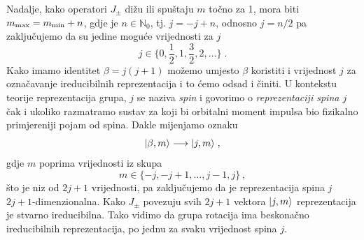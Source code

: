 Nadalje, kako operatori $J_\pm$ dižu ili spuštaju $m$ točno za 1, mora
biti $m_{\textrm{\scriptsize max}} = m_{\textrm{\scriptsize min}} +n $,
gdje je $n\in \mathbb{N}_{0}$, tj. $j = -j +n$, odnosno $j=n/2$ pa
zaključujemo da su jedine moguće vrijednosti za $j$
\begin{displaymath}
    j \in \{ 0, \frac{1}{2}, 1, \frac{3}{2}, 2, \ldots \}\;.
\end{displaymath}
Kako imamo identitet $\beta = j(j+1)$ možemo umjesto $\beta$ koristiti
i vrijednost $j$ za označavanje ireducibilnih reprezentacija i to ćemo
odsad i činiti. U kontekstu teorije reprezentacija grupa, $j$ se naziva
\emph{spin} i govorimo o \emph{reprezentaciji spina $j$} čak i ukoliko
razmatramo sustav za koji bi orbitalni moment impulsa
bio fizikalno primjereniji pojam od spina. 
Dakle mijenjamo oznaku
\begin{displaymath}
  | \beta, m \rangle \longrightarrow | j, m \rangle \;,
\end{displaymath}
gdje $m$ poprima vrijednosti iz skupa
\begin{displaymath}
    m \in \{ -j, -j+1, \ldots, j-1, j\} \,,
\end{displaymath}
što je niz od $2j+1$ vrijednosti, pa zaključujemo da je
reprezentacija spina $j$  $2j+1$-dimenzionalna.
Kako $J_{\pm}$ povezuju svih $2j+1$ vektora $| j, m \rangle$ 
reprezentacija je stvarno ireducibilna.
Tako vidimo da grupa rotacija ima beskonačno ireducibilnih
reprezentacija, po jednu za svaku vrijednost spina $j$.

